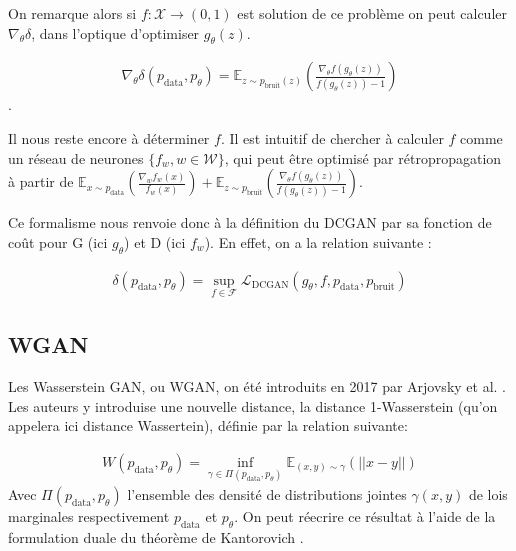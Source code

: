 On remarque alors si $f: \mathcal{X} \longrightarrow (0,1)$ est solution de ce problème on peut calculer $\nabla_{\theta} \delta$, dans l'optique d'optimiser $g_{\theta}(z)$. 

$$\begin{aligned}\nabla_{\theta} \delta(p_{\mathrm{data}}, p_{\theta}) = \mathbb{E}_{z\sim p_{\mathrm{bruit}}(z)} \left( \frac{\nabla_{\theta}f(g_{\theta}(z))}{f(g_{\theta}(z)) -1} \right)\end{aligned}$$.

Il nous reste encore à déterminer $f$. Il est intuitif de chercher à calculer $f$ comme un réseau de neurones $\{f_{w}, w \in \mathcal{W} \}$, qui peut être optimisé par rétropropagation à partir de  $\mathbb{E}_{x \sim p_{\mathrm{data}}}\left(\frac{\nabla_{w}f_{w}(x)}{f_{w}(x)}\right)+ \mathbb{E}_{z \sim p_{\mathrm{bruit}}}\left(\frac{\nabla_{\theta}f(g_{\theta}(z))}{f(g_{\theta}(z)) -1}\right)$.

Ce formalisme nous renvoie donc à la définition du DCGAN par sa fonction de coût pour G (ici $g_{\theta}$) et D (ici $f_{w}$). En effet, on a la relation suivante : 

$$\begin{aligned}
\delta(p_{\mathrm{data}}, p_{\theta}) = \sup_{f\in\mathcal{F}} \mathcal{L}_{\mathrm{DCGAN}}(g_{\theta}, f, p_{\mathrm{data}},  p_{\mathrm{bruit}})
\end{aligned}$$

\subsection{WGAN} \label{WGAN}

Les Wasserstein GAN, ou WGAN, on été introduits en 2017 par Arjovsky et al. \cite{arjovsky_wasserstein_2017}. Les auteurs y introduise une nouvelle distance, la distance 1-Wasserstein (qu'on appelera ici distance Wassertein), définie par la relation suivante:

$$\begin{aligned}
W(p_{\mathrm{data}}, p_{\theta}) = \inf_{\gamma \in \Pi (p_{\mathrm{data}}, p_{\theta})} \mathbb{E}_{(x, y) \sim \gamma} (||x - y||)
\end{aligned}$$
Avec $\Pi (p_{\mathrm{data}}, p_{\theta})$ l'ensemble des densité de distributions jointes $\gamma (x, y)$ de lois marginales respectivement $p_{\mathrm{data}}$ et $p_{\theta}$. On peut réecrire ce résultat à l'aide de la formulation duale du théorème de Kantorovich \cite{villani_optimal_2006}.


